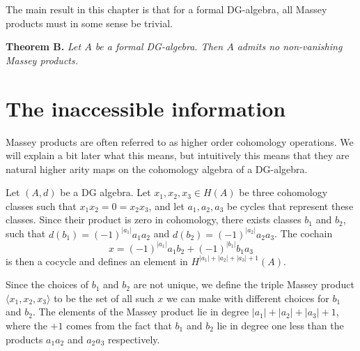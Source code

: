 The main result in this chapter is that for a formal DG-algebra, all Massey products must in some sense be trivial. 

\textbf{Theorem B. } \textit{Let $A$ be a formal DG-algebra. Then $A$ admits no non-vanishing Massey products.}



\section{The inaccessible information}

Massey products are often referred to as higher order cohomology operations. We will explain a bit later what this means, but intuitively this means that they are natural higher arity maps on the cohomology algebra of a DG-algebra. 

\begin{definition}
Let $(A,d)$ be a DG algebra. Let $x_1, x_2, x_3 \in H(A)$ be three cohomology classes such that $x_1 x_2 = 0 = x_2 x_3$, and let $a_1, a_2, a_3$ be cycles that represent these classes. Since their product is zero in cohomology, there exists classes $b_1$ and $b_2$, such that $d(b_1)=(-1)^{|a_1|}a_1a_2$ and $d(b_2)=(-1)^{|a_2|}a_2a_3$. The cochain 
\begin{equation*}
    x = (-1)^{|a_1|}a_1 b_2 + (-1)^{|b_1|}b_1 a_3
\end{equation*}
is then a cocycle and defines an element in $H^{|a_1|+|a_2|+|a_3|+1}(A)$.  

Since the choices of $b_1$ and $b_2$ are not unique, we define the triple Massey product $\langle x_1, x_2, x_3 \rangle$ to be the set of all such $x$ we can make with different choices for $b_1$ and $b_2$. The elements of the Massey product lie in degree $|a_1|+|a_2|+|a_3|+1$, where the $+1$ comes from the fact that $b_1$ and $b_2$ lie in degree one less than the products $a_1 a_2$ and $a_2 a_3$ respectively. 
\end{definition} 

